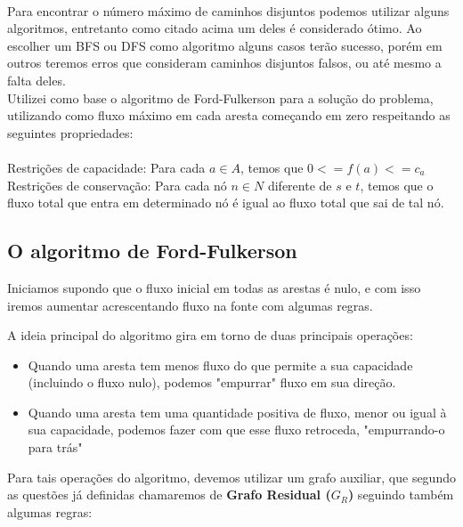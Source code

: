 \\

Para encontrar o número máximo de caminhos disjuntos podemos utilizar alguns algoritmos, entretanto como citado acima um deles é considerado ótimo. Ao escolher um BFS ou DFS como algoritmo alguns casos terão sucesso, porém em outros teremos erros que consideram caminhos disjuntos falsos, ou até mesmo a falta deles.
\\

Utilizei como base o algoritmo de Ford-Fulkerson para a solução do problema, utilizando como fluxo máximo em cada aresta começando em zero respeitando as seguintes propriedades:
\\
\\
Restrições de capacidade: Para cada $a \in A$, temos que $0 <= f(a) <= c_{a} $
\\
Restrições de conservação: Para cada nó $n \in N$ diferente de $s$ e $t$, temos que o fluxo total que entra em determinado nó é igual ao fluxo total que sai de tal nó.

\subsection{O algoritmo de Ford-Fulkerson}
Iniciamos supondo que o fluxo inicial em todas as arestas é nulo, e com isso iremos aumentar acrescentando fluxo na fonte com algumas regras.

A ideia principal do algoritmo gira em torno de duas principais operações:
\begin{itemize}
  \item Quando uma aresta tem menos fluxo do que permite a sua capacidade (incluindo o fluxo nulo), podemos "empurrar"  fluxo em sua direção.
\item Quando uma aresta tem uma quantidade positiva de fluxo, menor ou igual à sua capacidade, podemos fazer com que esse fluxo retroceda, "empurrando-o para trás"
\end{itemize}
\newpage
Para tais operações do algoritmo, devemos utilizar um grafo auxiliar, que segundo as questões já definidas chamaremos de \textbf{Grafo Residual ({$G_{R}$})} seguindo também algumas regras:


